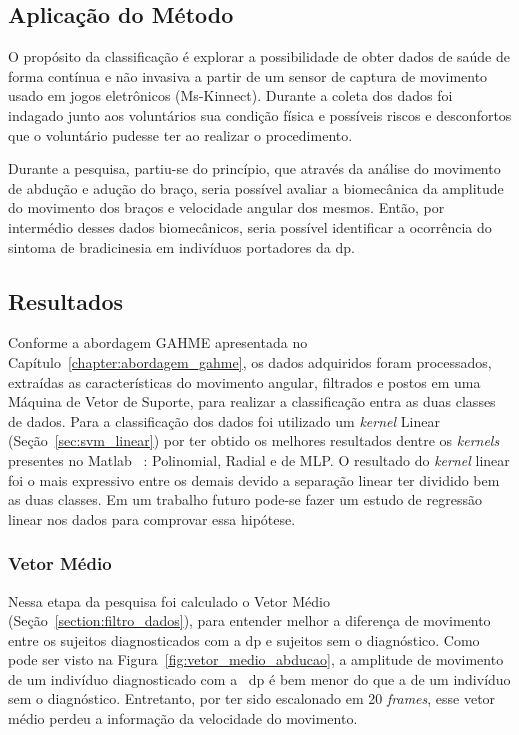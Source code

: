 \subsection{Aplicação do Método}
O propósito da classificação é explorar a possibilidade de obter dados de saúde de forma contínua e não invasiva a partir de um sensor de captura de movimento usado em jogos eletrônicos (Ms-Kinnect). Durante a coleta dos dados foi indagado junto aos voluntários sua condição física e possíveis riscos e desconfortos que o voluntário pudesse ter ao realizar o procedimento. 

Durante a pesquisa, partiu-se do princípio, que através da análise do movimento de abdução e adução do braço, seria possível avaliar a biomecânica da amplitude do movimento dos braços e velocidade angular dos mesmos. Então, por intermédio desses dados biomecânicos, seria possível identificar a ocorrência do sintoma de bradicinesia em indivíduos portadores da \ac{dp}.


\subsection{Resultados}
Conforme a abordagem GAHME apresentada no Capítulo~\ref{chapter:abordagem_gahme}, os dados adquiridos foram processados, extraídas as características do movimento angular, filtrados e postos em uma Máquina de Vetor de Suporte, para realizar a classificação entra as duas classes de dados. Para a classificação dos dados foi utilizado um \textit{kernel} Linear (Seção~\ref{sec:svm_linear}) por ter obtido os melhores resultados dentre os \textit{kernels} presentes no Matlab ~\cite{matlab2011}: Polinomial, Radial e de MLP. O resultado do \textit{kernel} linear foi o mais expressivo entre os demais devido a separação linear ter dividido bem as duas classes. Em um trabalho futuro pode-se fazer um estudo de regressão linear nos dados para comprovar essa hipótese.

\subsubsection{Vetor Médio}
Nessa etapa da pesquisa foi calculado o Vetor Médio (Seção~\ref{section:filtro_dados}), para entender melhor a diferença de movimento entre os sujeitos diagnosticados com a \ac{dp} e sujeitos sem o diagnóstico. Como pode ser visto na Figura~\ref{fig:vetor_medio_abducao}, a amplitude de movimento de um indivíduo diagnosticado com a ~\ac{dp} é bem menor do que a de um indivíduo sem o diagnóstico. Entretanto, por ter sido escalonado em 20 \textit{frames}, esse vetor médio perdeu a informação da velocidade do movimento.

